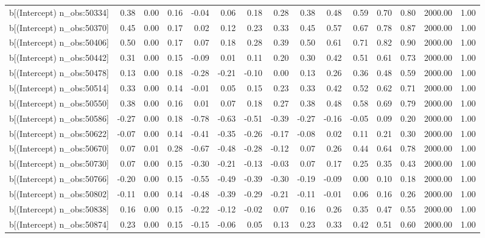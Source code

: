 \begin{table}[ht]
\begin{tabular}{rrrrrrrrrrrrrrr}
  b[(Intercept) n\_obs:50334] & 0.38 & 0.00 & 0.16 & -0.04 & 0.06 & 0.18 & 0.28 & 0.38 & 0.48 & 0.59 & 0.70 & 0.80 & 2000.00 & 1.00 \\ 
  b[(Intercept) n\_obs:50370] & 0.45 & 0.00 & 0.17 & 0.02 & 0.12 & 0.23 & 0.33 & 0.45 & 0.57 & 0.67 & 0.78 & 0.87 & 2000.00 & 1.00 \\ 
  b[(Intercept) n\_obs:50406] & 0.50 & 0.00 & 0.17 & 0.07 & 0.18 & 0.28 & 0.39 & 0.50 & 0.61 & 0.71 & 0.82 & 0.90 & 2000.00 & 1.00 \\ 
  b[(Intercept) n\_obs:50442] & 0.31 & 0.00 & 0.15 & -0.09 & 0.01 & 0.11 & 0.20 & 0.30 & 0.42 & 0.51 & 0.61 & 0.73 & 2000.00 & 1.00 \\ 
  b[(Intercept) n\_obs:50478] & 0.13 & 0.00 & 0.18 & -0.28 & -0.21 & -0.10 & 0.00 & 0.13 & 0.26 & 0.36 & 0.48 & 0.59 & 2000.00 & 1.00 \\ 
  b[(Intercept) n\_obs:50514] & 0.33 & 0.00 & 0.14 & -0.01 & 0.05 & 0.15 & 0.23 & 0.33 & 0.42 & 0.52 & 0.62 & 0.71 & 2000.00 & 1.00 \\ 
  b[(Intercept) n\_obs:50550] & 0.38 & 0.00 & 0.16 & 0.01 & 0.07 & 0.18 & 0.27 & 0.38 & 0.48 & 0.58 & 0.69 & 0.79 & 2000.00 & 1.00 \\ 
  b[(Intercept) n\_obs:50586] & -0.27 & 0.00 & 0.18 & -0.78 & -0.63 & -0.51 & -0.39 & -0.27 & -0.16 & -0.05 & 0.09 & 0.20 & 2000.00 & 1.00 \\ 
  b[(Intercept) n\_obs:50622] & -0.07 & 0.00 & 0.14 & -0.41 & -0.35 & -0.26 & -0.17 & -0.08 & 0.02 & 0.11 & 0.21 & 0.30 & 2000.00 & 1.00 \\ 
  b[(Intercept) n\_obs:50670] & 0.07 & 0.01 & 0.28 & -0.67 & -0.48 & -0.28 & -0.12 & 0.07 & 0.26 & 0.44 & 0.64 & 0.78 & 2000.00 & 1.00 \\ 
  b[(Intercept) n\_obs:50730] & 0.07 & 0.00 & 0.15 & -0.30 & -0.21 & -0.13 & -0.03 & 0.07 & 0.17 & 0.25 & 0.35 & 0.43 & 2000.00 & 1.00 \\ 
  b[(Intercept) n\_obs:50766] & -0.20 & 0.00 & 0.15 & -0.55 & -0.49 & -0.39 & -0.30 & -0.19 & -0.09 & 0.00 & 0.10 & 0.18 & 2000.00 & 1.00 \\ 
  b[(Intercept) n\_obs:50802] & -0.11 & 0.00 & 0.14 & -0.48 & -0.39 & -0.29 & -0.21 & -0.11 & -0.01 & 0.06 & 0.16 & 0.26 & 2000.00 & 1.00 \\ 
  b[(Intercept) n\_obs:50838] & 0.16 & 0.00 & 0.15 & -0.22 & -0.12 & -0.02 & 0.07 & 0.16 & 0.26 & 0.35 & 0.47 & 0.55 & 2000.00 & 1.00 \\ 
  b[(Intercept) n\_obs:50874] & 0.23 & 0.00 & 0.15 & -0.15 & -0.06 & 0.05 & 0.13 & 0.23 & 0.33 & 0.42 & 0.51 & 0.60 & 2000.00 & 1.00 \\ 

\end{tabular}
\end{table}
